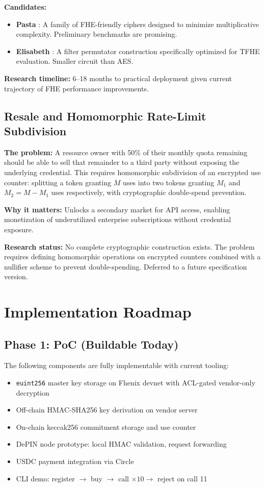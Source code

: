 \documentclass[conference]{IEEEtran}
\begin{document}
\textbf{Candidates:}
\begin{itemize}
\item \textbf{Pasta} \cite{pasta}: A family of FHE-friendly ciphers designed to
      minimize multiplicative complexity. Preliminary benchmarks are promising.
\item \textbf{Elisabeth} \cite{elisabeth}: A filter permutator construction
      specifically optimized for TFHE evaluation. Smaller circuit than AES.
\end{itemize}

\textbf{Research timeline:} 6--18 months to practical deployment given current
trajectory of FHE performance improvements.

\subsection{Resale and Homomorphic Rate-Limit Subdivision}

\textbf{The problem:} A resource owner with 50\% of their monthly quota remaining
should be able to sell that remainder to a third party without exposing the
underlying credential. This requires homomorphic subdivision of an encrypted use
counter: splitting a token granting $M$ uses into two tokens granting $M_1$ and
$M_2 = M - M_1$ uses respectively, with cryptographic double-spend prevention.

\textbf{Why it matters:} Unlocks a secondary market for API access, enabling
monetization of underutilized enterprise subscriptions without credential exposure.

\textbf{Research status:} No complete cryptographic construction exists. The
problem requires defining homomorphic operations on encrypted counters combined
with a nullifier scheme to prevent double-spending. Deferred to a future
specification version.

\section{Implementation Roadmap}
\label{sec:roadmap}

\subsection{Phase 1: PoC (Buildable Today)}
The following components are fully implementable with current tooling:
\begin{itemize}
\item \texttt{euint256} master key storage on Fhenix devnet with ACL-gated
      vendor-only decryption
\item Off-chain HMAC-SHA256 key derivation on vendor server
\item On-chain keccak256 commitment storage and use counter
\item DePIN node prototype: local HMAC validation, request forwarding
\item USDC payment integration via Circle
\item CLI demo: register $\rightarrow$ buy $\rightarrow$ call $\times 10 \rightarrow$
      reject on call 11
\end{itemize}
\end{document}
